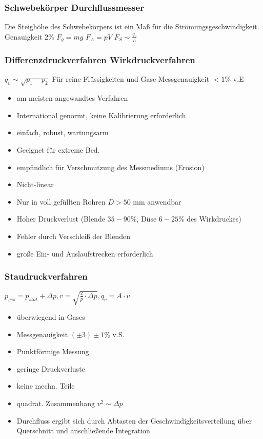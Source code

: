 \documentclass[a4paper]{scrartcl}
\begin{document}
\subsubsection{Schwebekörper Durchflussmesser}
Die Steighöhe des Schwebekörpers ist ein Maß für die Strömungsgeschwindigkeit. Genauigkeit $2 \%$
$F_g = mg$
$F_A = pV$
$F_S \sim \frac{q_v}{h}$

\subsubsection{Differenzdruckverfahren Wirkdruckverfahren}
$q_v \sim \sqrt{p_1 - p_2}$
Für reine Flüssigkeiten und Gase
Messgenauigkeit $<1 \% $ v.E
\begin{itemize}
\item am meisten angewandtes Verfahren
\item International genormt, keine Kalibrierung erforderlich
\item einfach, robust, wartungsarm
\item Geeignet für extreme Bed.
\item empfindlich für Verschmutzung des Messmediums (Erosion)
\item Nicht-linear
\item Nur in voll gefüllten Rohren $D > 50$ mm anwendbar
\item Hoher Druckverlust (Blende $35-90 \% $, Düse $6-25 \% $ des Wirkdruckes)
\item Fehler durch Verschleiß der Blenden
\item große Ein- und Auslaufstrecken erforderlich
\end{itemize}

\subsubsection{Staudruckverfahren}
$p_{ges} = p_{stat} + \Delta p, v= \sqrt{\frac{2}{p} \cdot \Delta p}, q_v = A \cdot v$
\begin{itemize}
\item überwiegend in Gases
\item Messgenauigkeit $( \pm 3) \pm 1 \%$ v.S.
\item Punktförmige Messung
\item geringe Druckverluste
\item keine mechn. Teile
\item quadrat. Zusammenhang $v^2 \sim \Delta p$
\item Durchfluss ergibt sich durch Abtasten der Geschwindigkeitsverteilung über Querschnitt und anschließende Integration
\end{itemize}
\end{document}
